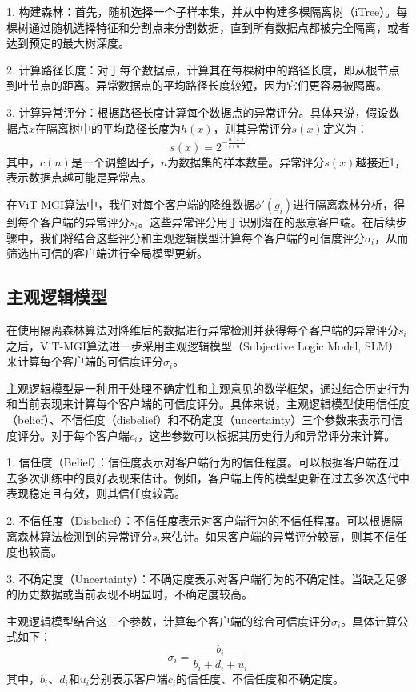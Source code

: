 \documentclass[conference]{IEEEtran}
\begin{document}
1. 构建森林：首先，随机选择一个子样本集，并从中构建多棵隔离树（iTree）。每棵树通过随机选择特征和分割点来分割数据，直到所有数据点都被完全隔离，或者达到预定的最大树深度。

2. 计算路径长度：对于每个数据点，计算其在每棵树中的路径长度，即从根节点到叶节点的距离。异常数据点的平均路径长度较短，因为它们更容易被隔离。

3. 计算异常评分：根据路径长度计算每个数据点的异常评分。具体来说，假设数据点$x$在隔离树中的平均路径长度为$h(x)$，则其异常评分$s(x)$定义为：
   \[
   s(x) = 2^{-\frac{h(x)}{c(n)}}
   \]
其中，$c(n)$是一个调整因子，$n$为数据集的样本数量。异常评分$s(x)$越接近1，表示数据点越可能是异常点。

在ViT-MGI算法中，我们对每个客户端的降维数据$\phi'(g_i)$进行隔离森林分析，得到每个客户端的异常评分$s_i$。这些异常评分用于识别潜在的恶意客户端。在后续步骤中，我们将结合这些评分和主观逻辑模型计算每个客户端的可信度评分$\sigma_i$，从而筛选出可信的客户端进行全局模型更新。

\subsection{主观逻辑模型}
\label{sec:method_subjective}

在使用隔离森林算法对降维后的数据进行异常检测并获得每个客户端的异常评分$s_i$之后，ViT-MGI算法进一步采用主观逻辑模型（Subjective Logic Model, SLM）来计算每个客户端的可信度评分$\sigma_i$。

主观逻辑模型是一种用于处理不确定性和主观意见的数学框架，通过结合历史行为和当前表现来计算每个客户端的可信度评分。具体来说，主观逻辑模型使用信任度（belief）、不信任度（disbelief）和不确定度（uncertainty）三个参数来表示可信度评分。对于每个客户端$c_i$，这些参数可以根据其历史行为和异常评分来计算。

1. 信任度（Belief）：信任度表示对客户端行为的信任程度。可以根据客户端在过去多次训练中的良好表现来估计。例如，客户端上传的模型更新在过去多次迭代中表现稳定且有效，则其信任度较高。

2. 不信任度（Disbelief）：不信任度表示对客户端行为的不信任程度。可以根据隔离森林算法检测到的异常评分$s_i$来估计。如果客户端的异常评分较高，则其不信任度也较高。

3. 不确定度（Uncertainty）：不确定度表示对客户端行为的不确定性。当缺乏足够的历史数据或当前表现不明显时，不确定度较高。

主观逻辑模型结合这三个参数，计算每个客户端的综合可信度评分$\sigma_i$。具体计算公式如下：
\[
\sigma_i = \frac{b_i}{b_i + d_i + u_i}
\]
其中，$b_i$、$d_i$和$u_i$分别表示客户端$c_i$的信任度、不信任度和不确定度。
\end{document}
